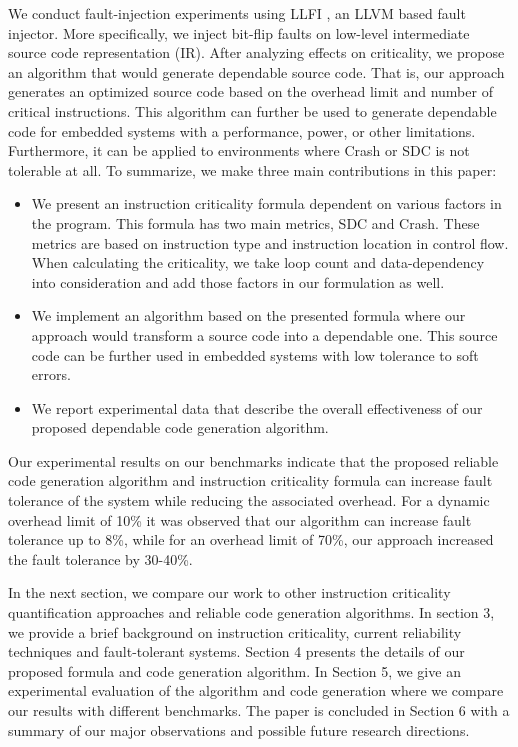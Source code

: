 We conduct fault-injection experiments using LLFI \cite{LLFI:2015}, an LLVM \cite{LLVM:2004} based fault injector. More specifically, we inject bit-flip faults on low-level intermediate source code representation (IR). After analyzing effects on criticality, we propose an algorithm that would generate dependable source code. That is, our approach generates an optimized source code based on the overhead limit and number of critical instructions. This algorithm can further be used to generate dependable code for embedded systems with a performance, power, or other limitations. Furthermore, it can be applied to environments where Crash or SDC is not tolerable at all. 
To summarize, we make three main contributions in this paper:
\begin{itemize}
  \item We present an instruction criticality formula dependent on various factors in the program. This formula has two main metrics, SDC and Crash. These metrics are based on instruction type and instruction location in control flow. When calculating the criticality, we take loop count and data-dependency into consideration and add those factors in our formulation as well. 
  \item We implement an algorithm based on the presented formula where our approach would transform a source code into a dependable one. This source code can be further used in embedded systems with low tolerance to soft errors.
  \item We report experimental data that describe the overall effectiveness of our proposed dependable code generation algorithm.
\end{itemize}

Our experimental results on our benchmarks indicate that the proposed reliable code generation algorithm and instruction criticality formula can increase fault tolerance of the system while reducing the associated overhead. For a dynamic overhead limit of 10\% it was observed that our algorithm can increase fault tolerance up to 8\%, while for an overhead limit of 70\%, our approach increased the fault tolerance by 30-40\%. 

In the next section, we compare our work to other instruction criticality quantification approaches and reliable code generation algorithms. In section 3, we provide a brief background on instruction criticality, current reliability techniques and fault-tolerant systems.  Section 4 presents the details of our proposed formula and code generation algorithm. In Section 5, we give an experimental evaluation of the algorithm and code generation where we compare our results with different benchmarks. The paper is concluded in Section 6 with a summary of our major observations and possible future research directions.



